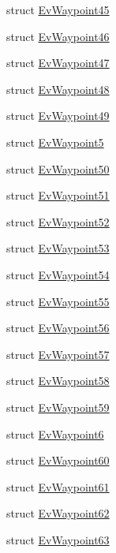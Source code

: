 \begin{DoxyCompactItemize}
struct \hyperlink{structmove__base__z__client_1_1EvWaypoint45}{Ev\+Waypoint45}
\item 
struct \hyperlink{structmove__base__z__client_1_1EvWaypoint46}{Ev\+Waypoint46}
\item 
struct \hyperlink{structmove__base__z__client_1_1EvWaypoint47}{Ev\+Waypoint47}
\item 
struct \hyperlink{structmove__base__z__client_1_1EvWaypoint48}{Ev\+Waypoint48}
\item 
struct \hyperlink{structmove__base__z__client_1_1EvWaypoint49}{Ev\+Waypoint49}
\item 
struct \hyperlink{structmove__base__z__client_1_1EvWaypoint5}{Ev\+Waypoint5}
\item 
struct \hyperlink{structmove__base__z__client_1_1EvWaypoint50}{Ev\+Waypoint50}
\item 
struct \hyperlink{structmove__base__z__client_1_1EvWaypoint51}{Ev\+Waypoint51}
\item 
struct \hyperlink{structmove__base__z__client_1_1EvWaypoint52}{Ev\+Waypoint52}
\item 
struct \hyperlink{structmove__base__z__client_1_1EvWaypoint53}{Ev\+Waypoint53}
\item 
struct \hyperlink{structmove__base__z__client_1_1EvWaypoint54}{Ev\+Waypoint54}
\item 
struct \hyperlink{structmove__base__z__client_1_1EvWaypoint55}{Ev\+Waypoint55}
\item 
struct \hyperlink{structmove__base__z__client_1_1EvWaypoint56}{Ev\+Waypoint56}
\item 
struct \hyperlink{structmove__base__z__client_1_1EvWaypoint57}{Ev\+Waypoint57}
\item 
struct \hyperlink{structmove__base__z__client_1_1EvWaypoint58}{Ev\+Waypoint58}
\item 
struct \hyperlink{structmove__base__z__client_1_1EvWaypoint59}{Ev\+Waypoint59}
\item 
struct \hyperlink{structmove__base__z__client_1_1EvWaypoint6}{Ev\+Waypoint6}
\item 
struct \hyperlink{structmove__base__z__client_1_1EvWaypoint60}{Ev\+Waypoint60}
\item 
struct \hyperlink{structmove__base__z__client_1_1EvWaypoint61}{Ev\+Waypoint61}
\item 
struct \hyperlink{structmove__base__z__client_1_1EvWaypoint62}{Ev\+Waypoint62}
\item 
struct \hyperlink{structmove__base__z__client_1_1EvWaypoint63}{Ev\+Waypoint63}
\item 

\end{DoxyCompactItemize}
